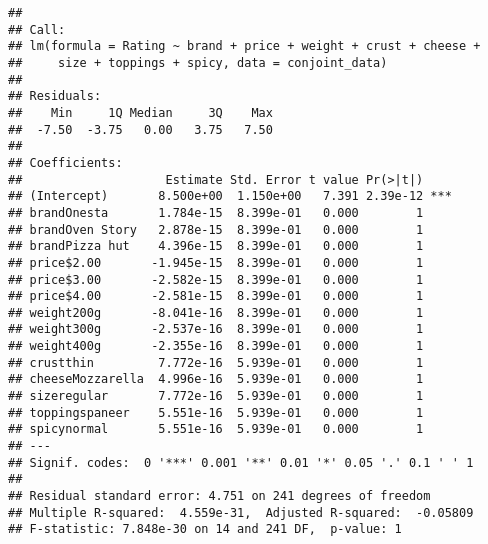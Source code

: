 \documentclass[
]{article}
\newenvironment{Shaded}{\begin{snugshade}}{\end{snugshade}}
\newcommand{\AttributeTok}[1]{\textcolor[rgb]{0.13,0.29,0.53}{#1}}
\newcommand{\CommentTok}[1]{\textcolor[rgb]{0.56,0.35,0.01}{\textit{#1}}}
\newcommand{\FunctionTok}[1]{\textcolor[rgb]{0.13,0.29,0.53}{\textbf{#1}}}
\newcommand{\NormalTok}[1]{#1}
\newcommand{\OtherTok}[1]{\textcolor[rgb]{0.56,0.35,0.01}{#1}}
\newcommand{\SpecialCharTok}[1]{\textcolor[rgb]{0.81,0.36,0.00}{\textbf{#1}}}
\newcommand{\StringTok}[1]{\textcolor[rgb]{0.31,0.60,0.02}{#1}}
\begin{document}
\begin{verbatim}
## 
## Call:
## lm(formula = Rating ~ brand + price + weight + crust + cheese + 
##     size + toppings + spicy, data = conjoint_data)
## 
## Residuals:
##    Min     1Q Median     3Q    Max 
##  -7.50  -3.75   0.00   3.75   7.50 
## 
## Coefficients:
##                    Estimate Std. Error t value Pr(>|t|)    
## (Intercept)       8.500e+00  1.150e+00   7.391 2.39e-12 ***
## brandOnesta       1.784e-15  8.399e-01   0.000        1    
## brandOven Story   2.878e-15  8.399e-01   0.000        1    
## brandPizza hut    4.396e-15  8.399e-01   0.000        1    
## price$2.00       -1.945e-15  8.399e-01   0.000        1    
## price$3.00       -2.582e-15  8.399e-01   0.000        1    
## price$4.00       -2.581e-15  8.399e-01   0.000        1    
## weight200g       -8.041e-16  8.399e-01   0.000        1    
## weight300g       -2.537e-16  8.399e-01   0.000        1    
## weight400g       -2.355e-16  8.399e-01   0.000        1    
## crustthin         7.772e-16  5.939e-01   0.000        1    
## cheeseMozzarella  4.996e-16  5.939e-01   0.000        1    
## sizeregular       7.772e-16  5.939e-01   0.000        1    
## toppingspaneer    5.551e-16  5.939e-01   0.000        1    
## spicynormal       5.551e-16  5.939e-01   0.000        1    
## ---
## Signif. codes:  0 '***' 0.001 '**' 0.01 '*' 0.05 '.' 0.1 ' ' 1
## 
## Residual standard error: 4.751 on 241 degrees of freedom
## Multiple R-squared:  4.559e-31,  Adjusted R-squared:  -0.05809 
## F-statistic: 7.848e-30 on 14 and 241 DF,  p-value: 1
\end{verbatim}

\begin{Shaded}
\end{Shaded}
\end{document}
